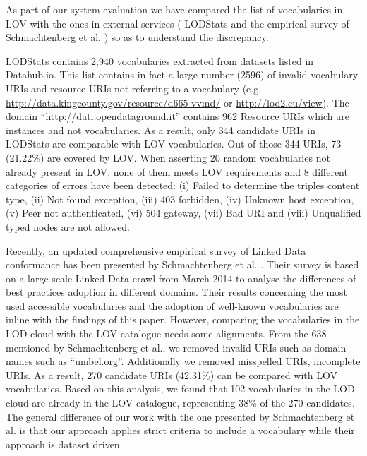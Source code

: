 \documentclass{iosart2c}
\begin{document}
As part of our system evaluation we have compared the list of vocabularies in LOV with the ones in external services ( LODStats and the empirical survey of Schmachtenberg et al. \cite{max2014}) so as to understand the discrepancy.

LODStats contains 2,940 vocabularies extracted from datasets listed in Datahub.io. This list contains in fact a large number (2596) of invalid vocabulary URIs and resource URIs not referring to a vocabulary (e.g. {\footnotesize\url{http://data.kingcounty.gov/resource/d665-vvmd/}} or {\footnotesize\url{http://lod2.eu/view}}). The domain ``http://dati.opendataground.it'' contains 962 Resource URIs which are instances and not vocabularies. As a result, only 344 candidate URIs in LODStats are comparable with LOV vocabularies. Out of those 344 URIs, 73 (21.22\%) are covered by LOV. When asserting 20 random vocabularies not already present in LOV, none of them meets LOV requirements  and 8 different categories of errors have been detected: (i) Failed to determine the triples content type, (ii) Not found exception, (iii) 403 forbidden, (iv) Unknown host exception, (v) Peer not authenticated, (vi) 504 gateway, (vii) Bad URI and (viii) Unqualified typed nodes are not allowed. 





Recently, an updated comprehensive empirical survey of Linked Data conformance has been presented by Schmachtenberg et al. \cite{max2014}. Their survey is based on a large-scale Linked Data crawl from March 2014 to analyse the differences of best practices adoption in different domains. Their results concerning the most used accessible vocabularies and the adoption of well-known vocabularies are inline with the findings of this paper. However, comparing the vocabularies in the LOD cloud with the LOV catalogue needs some alignments. From the 638 mentioned by Schmachtenberg et al., we removed invalid URIs such as domain names such as ``umbel.org''. Additionally we removed misspelled URIs, incomplete URIs. As a result, 270 candidate URIs (42.31\%) can be compared with LOV vocabularies. Based on this analysis, we found that 102 vocabularies in the LOD cloud are already in the LOV catalogue, representing 38\% of the 270 candidates. The general difference of our work with the one presented by Schmachtenberg et al. is that our approach applies strict criteria to include a vocabulary while their approach is dataset driven.
\end{document}
